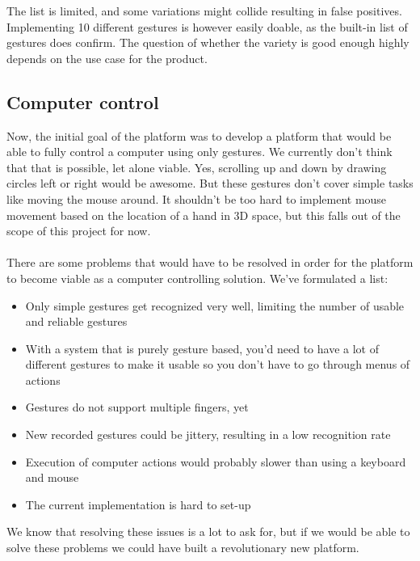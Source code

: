 \documentclass[a4paper]{article}
\providecommand{\tightlist}{%
\setlength{\itemsep}{0pt}\setlength{\parskip}{0pt}}
\begin{document}
  The list is limited, and some variations might collide resulting in false
  positives. Implementing 10 different gestures is however easily doable, as the
  built-in list of gestures does confirm. The question of whether the variety is
  good enough highly depends on the use case for the product.

  \subsection{Computer control}
  Now, the initial goal of the platform was to develop a platform that would be
  able to fully control a computer using only gestures. We currently don't think
  that that is possible, let alone viable.
  Yes, scrolling up and down by drawing circles left or right would be awesome.
  But these gestures don't cover simple tasks like moving the mouse around.
  It shouldn't be too hard to implement mouse movement based on the location of
  a hand in 3D space, but this falls out of the scope of this project for now.

  \paragraph{}
  There are some problems that would have to be resolved in order for the
  platform to become viable as a computer controlling solution. We've formulated
  a list:

  \begin{itemize}
    \tightlist
    \item Only simple gestures get recognized very well, limiting the number of
      usable and reliable gestures
    \item With a system that is purely gesture based, you'd need to have a lot
      of different gestures to make it usable so you don't have to go through
      menus of actions
    \item Gestures do not support multiple fingers, yet
    \item New recorded gestures could be jittery, resulting in a low recognition
      rate
    \item Execution of computer actions would probably slower than using a
      keyboard and mouse
    \item The current implementation is hard to set-up
  \end{itemize}

  We know that resolving these issues is a lot to ask for, but if we would be
  able to solve these problems we could have built a revolutionary new platform.
\end{document}
